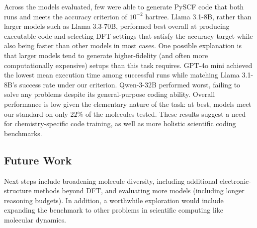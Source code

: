 
Across the models evaluated, few were able to generate PySCF code that both runs and meets the accuracy criterion of $10^{-2}$ hartree. Llama 3.1-8B, rather than larger models such as Llama 3.3-70B, performed best overall at producing executable code and selecting DFT settings that satisfy the accuracy target while also being faster than other models in most cases. One possible explanation is that larger models tend to generate higher-fidelity (and often more computationally expensive) setups than this task requires. GPT-4o mini achieved the lowest mean execution time among successful runs while matching Llama 3.1-8B’s success rate under our criterion. Qwen-3-32B performed worst, failing to solve any problems despite its general-purpose coding ability. 
Overall performance is low given the elementary nature of the task: at best, models meet our standard on only $22\%$ of the molecules tested. These results suggest a need for chemistry-specific code training, as well as more holistic scientific coding benchmarks.






\subsection*{Future Work}
Next steps include broadening molecule diversity, including additional electronic-structure methods beyond DFT, and evaluating more models (including longer reasoning budgets). In addition, a worthwhile exploration would include expanding the benchmark to other problems in scientific computing like molecular dynamics.
